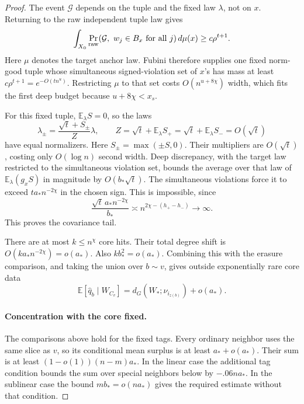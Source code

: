 \begin{proof}
The event \(\mathcal G\) depends on the tuple and the fixed law \(\lambda\), not on \(x\). Returning to the raw independent tuple law gives
\[
 \int_{X_0}\Pr_{\rm raw}
     (\mathcal G,\ w_j\in B_x\text{ for all }j)\,d\mu(x)
       \ge c\rho^{t+1}.
\]
Here \(\mu\) denotes the target anchor law. Fubini therefore supplies one fixed norm-good tuple whose simultaneous signed-violation set of \(x\)'s has mass at least \(c\rho^{t+1}=e^{-O(tn^u)}\). Restricting \(\mu\) to that set costs \(O(n^{u+8\chi})\) width, which fits the first deep budget because \(u+8\chi<x_s\).

For this fixed tuple, \(\mathbb E_\lambda S=0\), so the laws
\[
 \lambda_\pm=\frac{\sqrt t+S_\pm}{Z}\lambda,
 \qquad Z=\sqrt t+\mathbb E_\lambda S_+
           =\sqrt t+\mathbb E_\lambda S_-=O(\sqrt t)
\]
have equal normalizers. Here \(S_\pm=\max(\pm S,0)\). Their multipliers are \(O(\sqrt t)\), costing only \(O(\log n)\) second width. Deep discrepancy, with the target law restricted to the simultaneous violation set, bounds the average over that law of \(\mathbb E_\lambda(g_xS)\) in magnitude by \(O(b_*\sqrt t)\). The simultaneous violations force it to exceed \(ta_*n^{-2\chi}\) in the chosen sign. This is impossible, since
\[
 \frac{\sqrt t\,a_*n^{-2\chi}}{b_*}
       \asymp n^{2\chi-(h_+-h_-)}\longrightarrow\infty.
\]
This proves the covariance tail.

There are at most \(k\le n^\chi\) core hits. Their total degree shift is \(O(ka_*n^{-2\chi})=o(a_*)\). Also \(kb_*^2=o(a_*)\). Combining this with the erasure comparison, and taking the union over \(b\sim v\), gives outside exponentially rare core data
\[
 \mathbb E[\widehat q_b\mid W_{C_v}]
       =d_G(W_*;\nu_{i_{z(b)}})+o(a_*).
\]

\paragraph{Concentration with the core fixed.}
The comparisons above hold for the fixed tags. Every ordinary neighbor uses the same slice as \(v\), so its conditional mean surplus is at least \(a_*+o(a_*)\). Their sum is at least \((1-o(1))(n-m)a_*\). In the linear case the additional tag condition bounds the sum over special neighbors below by \(-.06na_*\). In the sublinear case the bound \(mb_*=o(na_*)\) gives the required estimate without that condition.


\end{proof}
